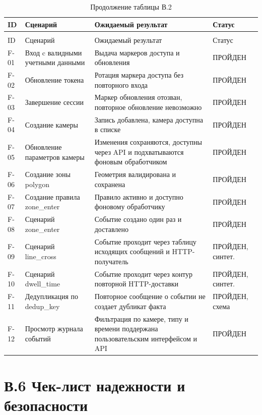 \scriptsize
\begin{longtable}{@{}p{}p{}p{}p{}@{}}
\caption{Чек-лист функционального тестирования}\\
\toprule
ID & Сценарий & Ожидаемый результат & Статус \\
\midrule
\endfirsthead
\caption*{Продолжение таблицы В.2}\\
\toprule
ID & Сценарий & Ожидаемый результат & Статус \\
\midrule
\endhead
F-01 & Вход c валидными учетными данными & Выдача маркеров доступа и обновления & ПРОЙДЕН \\
F-02 & Обновление токена & Ротация маркера доступа без повторного входа & ПРОЙДЕН \\
F-03 & Завершение сессии & Маркер обновления отозван, повторное обновление невозможно & ПРОЙДЕН \\
F-04 & Создание камеры & Запись добавлена, камера доступна в списке & ПРОЙДЕН \\
F-05 & Обновление параметров камеры & Изменения сохраняются, доступны через API и подхватываются фоновым обработчиком & ПРОЙДЕН \\
F-06 & Создание зоны polygon & Геометрия валидирована и сохранена & ПРОЙДЕН \\
F-07 & Создание правила zone\_enter & Правило активно и доступно фоновому обработчику & ПРОЙДЕН \\
F-08 & Сценарий zone\_enter & Событие создано один раз и доставлено & ПРОЙДЕН \\
F-09 & Сценарий line\_cross & Событие проходит через таблицу исходящих сообщений и HTTP-получатель & ПРОЙДЕН, синтет. \\
F-10 & Сценарий dwell\_time & Событие проходит через контур повторной HTTP-доставки & ПРОЙДЕН, синтет. \\
F-11 & Дедупликация по dedup\_key & Повторное сообщение о событии не создает дубликат факта & ПРОЙДЕН, схема \\
F-12 & Просмотр журнала событий & Фильтрация по камере, типу и времени поддержана пользовательским интерфейсом и API & ПРОЙДЕН \\
\bottomrule
\end{longtable}
\normalsize

\section*{В.6 Чек-лист надежности и безопасности}
{}

